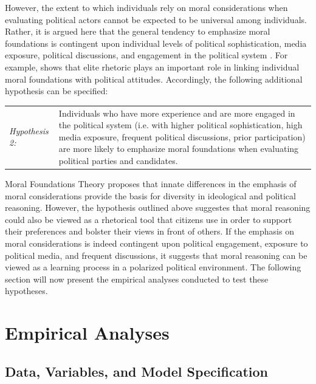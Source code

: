 \documentclass[12pt]{article}
\begin{document}
However, the extent to which individuals rely on moral considerations when evaluating political actors cannot be expected to be universal among individuals. Rather, it is argued here that the general tendency to emphasize moral foundations is contingent upon individual levels of political sophistication, media exposure, political discussions, and engagement in the political system \citep[see also][]{goren2001core,goren2004political}. For example, \citet{clifford2015concerns} shows that elite rhetoric plays an important role in linking individual moral foundations with political attitudes. Accordingly, the following additional hypothesis can be specified:

%
%

\vspace{0.3cm}
\begin{tabular}{lp{12cm}}
\textsl{Hypothesis 2:} & Individuals who have more experience and are more engaged in the political system (i.e. with higher political sophistication, high media exposure, frequent political discussions, prior participation) are more likely to emphasize moral foundations when evaluating political parties and candidates.
\end{tabular}
\vspace{0.5cm}

Moral Foundations Theory proposes that innate differences in the emphasis of moral considerations provide the basis for diversity in ideological and political reasoning. However, the hypothesis outlined above suggestes that moral reasoning could also be viewed as a rhetorical tool that citizens use in order to support their preferences and bolster their views in front of others. If the emphasis on moral considerations is indeed contingent upon political engagement, exposure to political media, and frequent discussions, it suggests that moral reasoning can be viewed as a learning process in a polarized political environment. The following section will now present the empirical analyses conducted to test these hypotheses.


\section{Empirical Analyses}

\subsection{Data, Variables, and Model Specification}
\end{document}
